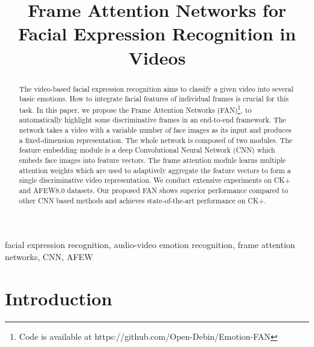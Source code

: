 \documentclass{article}
\title{Frame Attention Networks for Facial Expression Recognition in Videos}
\begin{document}
\maketitle


\thispagestyle{fancy}
\fancyhead{}
\lhead{}
\cfoot{}
\rfoot{}


\begin{abstract}
The video-based facial expression recognition aims to classify a given video into several basic emotions. How to integrate facial features of individual frames is crucial for this task. In this paper, we propose the Frame Attention Networks (FAN)\footnote{Code is available at https://github.com/Open-Debin/Emotion-FAN}, to automatically highlight some discriminative frames in an end-to-end framework.
The network takes a video with a variable number of face images as its input and produces a fixed-dimension representation. The whole network is composed of two modules. The feature embedding module is a deep Convolutional Neural Network (CNN) which embeds face images into feature vectors. The frame attention module learns multiple attention weights which are used to adaptively aggregate the feature vectors to form a single discriminative video representation.
We conduct extensive experiments on CK+ and AFEW8.0 datasets. Our proposed FAN shows superior performance compared to other CNN based methods and achieves state-of-the-art performance on CK+. 

\end{abstract}
\begin{keywords}
facial expression recognition, audio-video emotion recognition, frame attention networks, CNN, AFEW
\end{keywords}
\section{Introduction}
\label{sec:intro}
\end{document}
